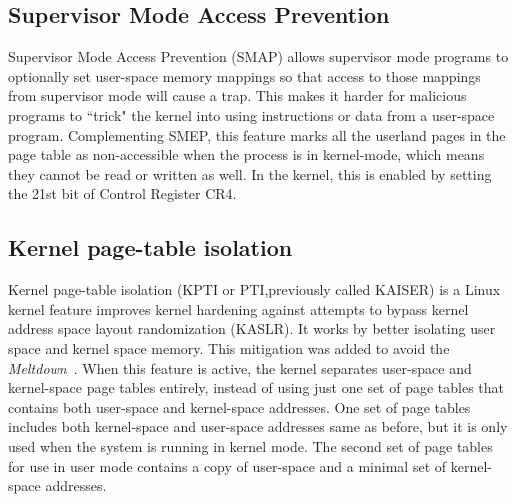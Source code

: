 \documentclass{masterthesis}
\begin{document}
\subsection{Supervisor Mode Access Prevention}
\label{subsect:SMAP}
Supervisor Mode Access Prevention (SMAP) allows supervisor mode programs to optionally set user-space memory mappings so that access to those mappings from supervisor mode will cause a trap. This makes it harder for malicious programs to ``trick" the kernel into using instructions or data from a user-space program.
Complementing SMEP, this feature marks all the userland pages in the page table as non-accessible when the process is in kernel-mode, which means they cannot be read or written as well. In the kernel, this is enabled by setting the 21st bit of Control Register CR4.

\subsection{Kernel page-table isolation}
\label{subsect:KPTI}
Kernel page-table isolation (KPTI or PTI,previously called KAISER) is a Linux kernel feature improves kernel hardening against attempts to bypass kernel address space layout randomization (KASLR). It works by better isolating user space and kernel space memory.
This mitigation was added to avoid the \emph{Meltdown}~\cite{lipp2018meltdown}.
When this feature is active, the kernel separates user-space and kernel-space page tables entirely, instead of using just one set of page tables that contains both user-space and kernel-space addresses. One set of page tables includes both kernel-space and user-space addresses same as before, but it is only used when the system is running in kernel mode. The second set of page tables for use in user mode contains a copy of user-space and a minimal set of kernel-space addresses.
\end{document}
